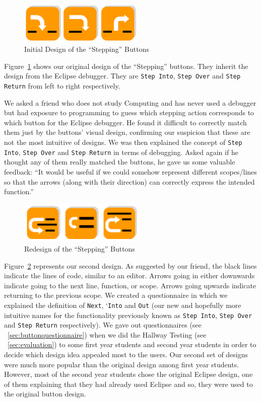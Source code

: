 \documentclass[11pt, a4paper]{article}
\newcommand{\cmd}[1]{{\tt #1}}
\begin{document}
\begin{figure}[h!]
\centering
\includegraphics[height=20mm,width=60mm]{buttons1.png}
\caption{Initial Design of the ``Stepping'' Buttons}
\label{fig:button1}
\end{figure}

Figure~\ref{fig:button1} shows our original design of the ``Stepping'' buttons.
They inherit the design from the Eclipse debugger.
They are \cmd{Step Into}, \cmd{Step Over} and \cmd{Step Return} from left to right respectively.

We asked a friend who does not study Computing and has never used a debugger but had exposure to programming to guess which stepping action corresponds to which button for the Eclipse debugger.
He found it difficult to correctly match them just by the buttons' visual design, confirming our suspicion that these are not the most intuitive of designs.
We was then explained the concept of \cmd{Step Into}, \cmd{Step Over} and \cmd{Step Return} in terms of debugging.
Asked again if he thought any of them really matched the buttons, he gave us some valuable feedback: ``It would be useful if we could somehow represent different scopes/lines so that the arrows (along with their direction) can correctly express the intended function.''
\begin{figure}[h!]
\centering
\includegraphics[height=20mm,width=60mm]{buttons2.png}
\caption{Redesign of the ``Stepping'' Buttons}
\label{fig:buttons2}
\end{figure}

Figure~\ref{fig:buttons2} represents our second design.
As suggested by our friend, the black lines indicate the lines of code, similar to an editor.
Arrows going in either downwards indicate going to the next line, function, or scope.
Arrows going upwards indicate returning to the previous scope.
We created a questionnaire in which we explained the definition of \cmd{Next}, `\cmd{Into} and \cmd{Out} (our new and hopefully more intuitive names for the functionality previously known as \cmd{Step Into}, \cmd{Step Over} and \cmd{Step Return} respectively).
We gave out questionnaires (see ~\cref{sec:buttonquestionnaire}) when we did the Hallway Testing (see ~\cref{sec:evaluation}) to some first year students and second year students in order to decide which design idea appealed most to the users.
Our second set of designs were much more popular than the original design among first year students.
However, most of the second year students chose the original Eclipse design, one of them explaining that they had already used Eclipse and so, they were used to the original button design.
\end{document}
